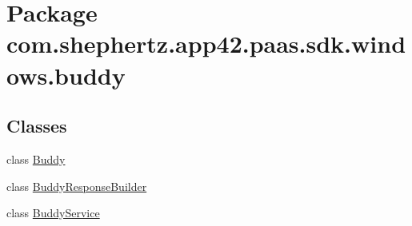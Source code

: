\hypertarget{namespacecom_1_1shephertz_1_1app42_1_1paas_1_1sdk_1_1windows_1_1buddy}{\section{Package com.\+shephertz.\+app42.\+paas.\+sdk.\+windows.\+buddy}
\label{namespacecom_1_1shephertz_1_1app42_1_1paas_1_1sdk_1_1windows_1_1buddy}
}
\subsection*{Classes}
\begin{DoxyCompactItemize}
\item 
class \hyperlink{classcom_1_1shephertz_1_1app42_1_1paas_1_1sdk_1_1windows_1_1buddy_1_1_buddy}{Buddy}
\item 
class \hyperlink{classcom_1_1shephertz_1_1app42_1_1paas_1_1sdk_1_1windows_1_1buddy_1_1_buddy_response_builder}{Buddy\+Response\+Builder}
\item 
class \hyperlink{classcom_1_1shephertz_1_1app42_1_1paas_1_1sdk_1_1windows_1_1buddy_1_1_buddy_service}{Buddy\+Service}
\end{DoxyCompactItemize}
